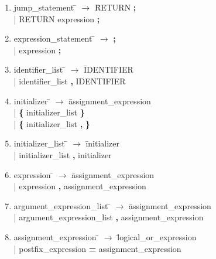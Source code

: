 \documentclass[12pt]{article}
\begin{document}
\begin{enumerate}
\item \begin{tabbing} jump{\_}statement \= $\to$ \= RETURN \textbf{;} \\
	\> | \> RETURN expression \textbf{;}
\end{tabbing}

\item \begin{tabbing} expression{\_}statement \= $\to$ \= \textbf{;} \\
	\> | \> expression \textbf{;}
\end{tabbing}

\item \begin{tabbing} identifier{\_}list \= $\to$ \= IDENTIFIER \\
	\> | \> identifier{\_}list \textbf{,} IDENTIFIER
\end{tabbing}

\item \begin{tabbing} initializer \= $\to$ \= assignment{\_}expression \\
	\> | \> \textbf{\{} initializer{\_}list \textbf{\}} \\
	\> | \> \textbf{\{} initializer{\_}list \textbf{,} \textbf{\}}
\end{tabbing}

\item \begin{tabbing} initializer{\_}list \= $\to$ \= initializer \\
	\> | \> initializer{\_}list \textbf{,} initializer
\end{tabbing}

\item \begin{tabbing} expression \= $\to$ \= assignment{\_}expression \\
	\> | \> expression \textbf{,} assignment{\_}expression
\end{tabbing}

\item \begin{tabbing} argument{\_}expression{\_}list \= $\to$ \= assignment{\_}expression \\
	\> | \> argument{\_}expression{\_}list \textbf{,} assignment{\_}expression
\end{tabbing}

\item \begin{tabbing} assignment{\_}expression \= $\to$ \= logical{\_}or{\_}expression \\
	\> | \> postfix{\_}expression \textbf{=} assignment{\_}expression
\end{tabbing}


\end{enumerate}
\end{document}
